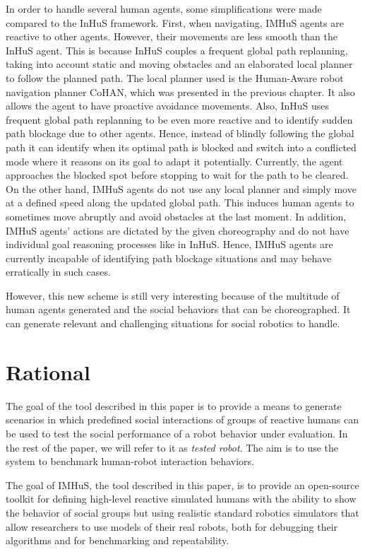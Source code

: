 In order to handle several human agents, some simplifications were made compared to the InHuS framework. First, when navigating, IMHuS agents are reactive to other agents. However, their movements are less smooth than the InHuS agent. This is because InHuS couples a frequent global path replanning, taking into account static and moving obstacles and an elaborated local planner to follow the planned path. The local planner used is the Human-Aware robot navigation planner CoHAN, which was presented in the previous chapter. It also allows the agent to have proactive avoidance movements. Also, InHuS uses frequent global path replanning to be even more reactive and to identify sudden path blockage due to other agents. Hence, instead of blindly following the global path it can identify when its optimal path is blocked and switch into a conflicted mode where it reasons on its goal to adapt it potentially. Currently, the agent approaches the blocked spot before stopping to wait for the path to be cleared. 
On the other hand, IMHuS agents do not use any local planner and simply move at a defined speed along the updated global path. This induces human agents to sometimes move abruptly and avoid obstacles at the last moment. 
In addition, IMHuS agents' actions are dictated by the given choreography and do not have individual goal reasoning processes like in InHuS. Hence, IMHuS agents are currently incapable of identifying path blockage situations and may behave erratically in such cases.  

However, this new scheme is still very interesting because of the multitude of human agents generated and the social behaviors that can be choreographed. It can generate relevant and challenging situations for social robotics to handle.


\section{Rational}

The goal of the tool described in this paper is to provide a means to generate scenarios in which predefined social interactions of groups of reactive humans can be used to test the social performance of a robot behavior under evaluation. In the rest of the paper, we will refer to it as \textit{tested robot}. The aim is to use the system to benchmark human-robot interaction behaviors.

The goal of IMHuS, the tool described in this paper, is to provide an open-source toolkit for defining high-level reactive simulated humans with the ability to show the behavior of social groups but using realistic standard robotics simulators that allow researchers to use models of their real robots, both for debugging their algorithms and for benchmarking and repeatability.


